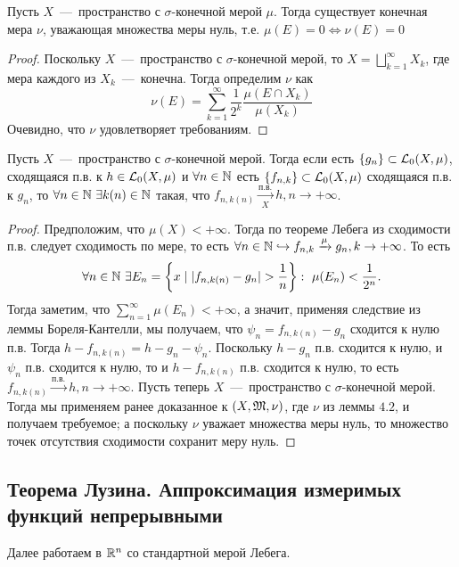 \begin{lemma}
    Пусть $X$~---~пространство с $\sigma$-конечной мерой $\mu$. Тогда существует конечная мера $\nu$, уважающая множества меры нуль, т.е. $\mu(E) = 0 \Longleftrightarrow \nu(E) = 0$
\end{lemma}
\begin{proof}
    Поскольку $X$~---~пространство с $\sigma$-конечной мерой, то $X = \bigsqcup\limits_{k = 1}^\infty X_k$, где мера каждого из $X_k$~---~конечна. Тогда определим $\nu$ как \[\nu(E) = \sum\limits_{k = 1}^\infty \frac{1}{2^k} \frac{\mu(E \cap X_k)}{\mu(X_k)}\]
    Очевидно, что $\nu$ удовлетворяет требованиям.
\end{proof}

\begin{theorem}
    Пусть $X$~---~пространство с $\sigma$-конечной мерой. Тогда если есть $\{g_n\} \subset \mathcal{L}_0(X, \mu)$, сходящаяся п.в. к $h \in \mathcal{L}_0(X, \mu)$ и $\forall n \in \mathbb{N}$ есть $\{f_{n,k}\} \subset \mathcal{L}_0(X, \mu)$ сходящаяся п.в. к $g_n$, то $\forall n \in \mathbb{N} \ \exists k(n) \in \mathbb{N}$ такая, что $f_{n, k(n)} \xrightarrow[X]{\text{п.в.}} h, n \rightarrow +\infty$.
\end{theorem}
\begin{proof}
    Предположим, что $\mu(X) < +\infty$. Тогда по теореме Лебега из сходимости п.в. следует сходимость по мере, то есть $\forall n \in \mathbb{N} \hookrightarrow f_{n, k} \xrightarrow{\mu} g_n, k \rightarrow +\infty$. То есть $$\forall n \in \mathbb{N} \ \exists E_n = \left\{x \mid |f_{n, k(n)} - g_n| > \frac{1}{n}\right\}: \text{ } \mu(E_n) < \frac{1}{2^n}.$$ Тогда заметим, что $\sum\limits_{n = 1}^\infty \mu(E_n) < +\infty$, а значит, применяя следствие из леммы Бореля-Кантелли, мы получаем, что $\psi_n = f_{n, k(n)} - g_n$ сходится к нулю п.в. Тогда $h - f_{n, k(n)} = h - g_n - \psi_n$. Поскольку $h - g_n$  п.в. сходится к нулю, и $\psi_n$ п.в. сходится к нулю, то и $h - f_{n, k(n)}$ п.в. сходится к нулю, то есть $f_{n, k(n)} \xrightarrow{\text{п.в.}} h, n \rightarrow +\infty$.
    Пусть теперь $X$~---~пространство с $\sigma$-конечной мерой. Тогда мы применяем ранее доказанное к $(X, \mathfrak{M}, \nu)$, где $\nu$ из леммы $4.2$, и получаем требуемое; а поскольку $\nu$ уважает множества меры нуль, то множество точек отсутствия сходимости сохранит меру нуль.
\end{proof}

\subsection{Теорема Лузина. Аппроксимация измеримых функций непрерывными}
\begin{note}
    Далее работаем в $\mathbb{R}^n$ со стандартной мерой Лебега.
\end{note}

